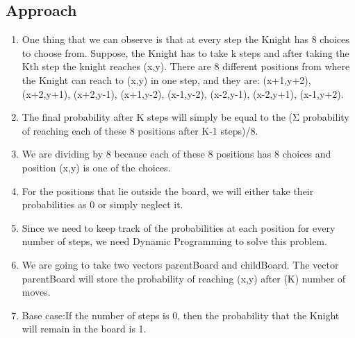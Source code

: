\documentclass[conference]{IEEEtran}
\begin{document}
\subsection{ \textbf{Approach }}
\begin{enumerate}
\item  One thing that we can observe is that at every step the Knight has 8 choices to choose from. Suppose, the Knight has to take k steps and after taking the Kth step the knight reaches (x,y). There are 8 different positions from where the Knight can reach to (x,y) in one step, and they are: (x+1,y+2), (x+2,y+1), (x+2,y-1), (x+1,y-2), (x-1,y-2), (x-2,y-1), (x-2,y+1), (x-1,y+2). 
\item  The final probability after K steps will simply be equal to the (Σ probability of reaching each of these 8 positions after K-1 steps)/8.
\item We are dividing by 8 because each of these 8 positions has 8 choices and position (x,y) is one of the choices. 
\item For the positions that lie outside the board, we will either take their probabilities as 0 or simply neglect it.
\item Since we need to keep track of the probabilities at each position for every number of steps, we need Dynamic Programming to solve this problem. 
\item We are going to take two vectors parentBoard and childBoard. The vector parentBoard will store the probability of reaching (x,y) after (K) number of moves.
\item Base case:If the number of steps is 0, then the probability that the Knight will remain in the board is 1.
\end{enumerate}
\end{document}
